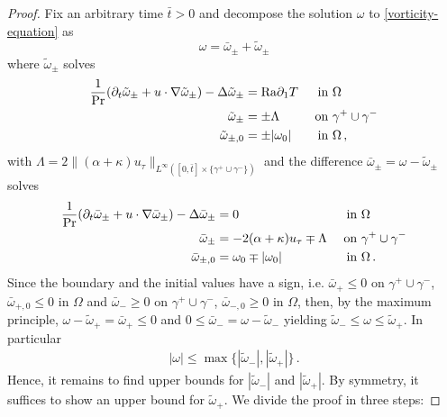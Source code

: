 \documentclass{article}
\theoremstyle{definition}
\theoremstyle{definition}
\newcommand{\gplus}{\gamma^+}
\newcommand{\gminus}{\gamma^-}
\newcommand{\Pra}{\rm{Pr}}
\newcommand{\Ra}{{\rm{Ra}}}
\begin{document}
\begin{proof}
Fix an arbitrary time $\bar t>0$ and decompose the solution $\omega$ to \eqref{vorticity-equation} as
$$\omega=\bar\omega_\pm +\tilde \omega_\pm $$
where $\tilde \omega_\pm$ solves
\begin{equation*}
    \begin{aligned}
        \frac{1}{\Pra} (\partial_t \tilde\omega_\pm + u\cdot \nabla \tilde \omega_\pm)-\Delta \tilde \omega_\pm &= \Ra \partial_1 T  &\textnormal{ in } &\Omega\\
        \tilde \omega_\pm &= \pm \Lambda &\textnormal{ on } &\gamma^+\cup\gamma^-\\
        \tilde \omega_{\pm,0} &= \pm |\omega_0| &\textnormal{ in } &\Omega\,,
    \end{aligned}
\end{equation*}
with $\Lambda= 2 \|(\alpha+\kappa)u_\tau\|_{L^\infty([0,\bar t]\times\lbrace\gamma^+\cup\gamma^-\rbrace)}$ and the difference $\bar\omega_\pm = \omega -\tilde \omega_\pm$ solves
\begin{equation*}
    \begin{aligned}
        \frac{1}{\Pra} (\partial_t \bar\omega_\pm + u\cdot \nabla \bar \omega_\pm)-\Delta \bar \omega_\pm &= 0  &\textnormal{ in } &\Omega\\
        \bar \omega_\pm &= -2(\alpha+\kappa) u_\tau \mp \Lambda  &\textnormal{ on } &\gamma^+\cup\gamma^-\\
        \bar \omega_{\pm,0} &= \omega_0 \mp |\omega_0| &\textnormal{ in } &\Omega\,.
    \end{aligned}
\end{equation*}
Since the boundary and the initial values have a sign, i.e. $\bar{\omega}_+\leq 0$ on $\gplus\cup\gminus$, $\bar{\omega}_{+,0}\leq 0$ in $\Omega$ and $\bar{\omega}_-\geq 0$ on $\gplus\cup\gminus$, $\bar{\omega}_{-,0}\geq 0$ in $\Omega$, then, by the maximum principle, $\omega -\tilde \omega_+ =\bar \omega_+ \leq 0 $ and $0\leq \bar \omega_- = \omega - \tilde \omega_-$ yielding $\tilde \omega_- \leq \omega \leq \tilde \omega_+$.
In particular
\begin{align}
    |\omega| \leq \max \lbrace |\tilde\omega_-|,|\tilde \omega_+| \rbrace\,.
\end{align}
Hence, it remains to find upper bounds for $|\tilde\omega_-|$ and $|\tilde \omega_+|$. By symmetry, it suffices to show an upper bound for $\tilde \omega_+$. We divide the proof in three steps:


\end{proof}
\end{document}
